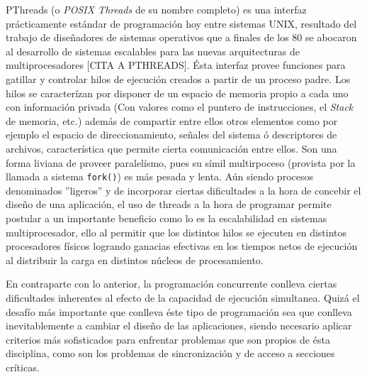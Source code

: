 PThreads (o \emph{POSIX Threads} de su nombre completo) es una interfaz prácticamente estándar de programación hoy entre sistemas UNIX, resultado del trabajo de diseñadores de sistemas operativos que a finales de los 80 se abocaron al desarrollo de sistemas escalables para las nuevas arquitecturas de multiprocesadores [CITA A PTHREADS]. Ésta interfaz provee funciones para gatillar y controlar hilos de ejecución creados a partir de un proceso padre. Los hilos se caracterízan por disponer de un espacio de memoria propio a cada uno con información privada (Con valores como el puntero de instrucciones, el \emph{Stack} de memoria, etc.) además de compartir entre ellos otros elementos como  por ejemplo el espacio de direccionamiento, señales del sistema ó descriptores de archivos, característica que permite cierta comunicación entre ellos. Son una forma liviana de proveer paralelísmo, pues su símil multirpoceso (provista por la llamada a sistema \verb=fork()=) es más pesada y lenta. Aún siendo procesos denominados ''ligeros'' y de incorporar ciertas dificultades a la hora de concebir el diseño de una aplicación, el uso de threads a la hora de programar permite postular a un importante beneficio como lo es la escalabilidad en sistemas multiprocesador, ello al permitir que los distintos hilos se ejecuten en distintos procesadores físicos logrando ganacias efectivas en los tiempos netos de ejecución al distribuir la carga en distintos núcleos de procesamiento.

En contraparte con lo anterior, la programación concurrente conlleva ciertas dificultades inherentes al efecto de la capacidad de ejecución simultanea. Quizá el desafío más importante que conlleva éste tipo de programación sea que conlleva inevitablemente a cambiar el diseño de las aplicaciones, siendo necesario aplicar criterios más sofisticados para enfrentar problemas que son propios de ésta disciplina, como son los problemas de sincronización y de acceso a secciones críticas.


